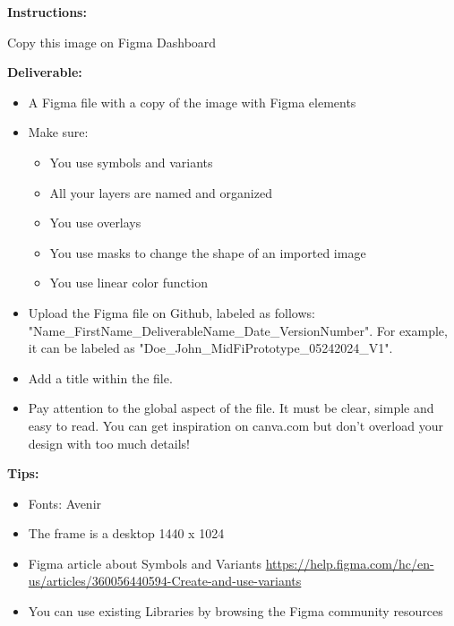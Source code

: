 \makeheaderfiles

\textbf{Instructions:}

Copy this image on Figma
Dashboard

\textbf{Deliverable:}

\begin{itemize}
\item A Figma file with a copy of the image with Figma elements
\item Make sure:
\begin{itemize}
\item You use symbols and variants
\item All your layers are named and organized
\item You use overlays
\item You use masks to change the shape of an imported image
\item You use linear color function
\end{itemize}
\item Upload the Figma file on Github, labeled as follows: "Name\_FirstName\_DeliverableName\_Date\_VersionNumber". For example, it can be labeled as "Doe\_John\_MidFiPrototype\_05242024\_V1".
\item Add a title within the file.
\item Pay attention to the global aspect of the file. It must be clear, simple and easy to read. You can get inspiration on canva.com but don't overload your design with too much details!
\end{itemize}

\textbf{Tips:}

\begin{itemize}
\item Fonts: Avenir
\item The frame is a desktop 1440 x 1024
\item Figma article about Symbols and Variants \url{https://help.figma.com/hc/en-us/articles/360056440594-Create-and-use-variants}
\item You can use existing Libraries by browsing the Figma community resources
\end{itemize}

